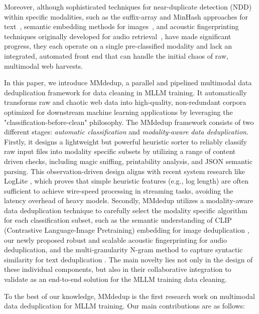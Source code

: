 \documentclass[sigconf, nonacm]{acmart}
\begin{document}
Moreover, although sophisticated techniques for near-duplicate detection (NDD) within specific modalities, such as the suffix-array and MinHash approaches for text~\cite{lee2022deduplicating}, semantic embedding methods for images~\cite{abbas2023semdedup}, and acoustic fingerprinting techniques originally developed for audio retrieval~\cite{wang2003industrial}, have made significant progress, they each operate on a single pre-classified modality and lack an integrated, automated front end that can handle the initial chaos of raw, multimodal web harvests.

In this paper, we introduce MMdedup, a parallel and pipelined multimodal data deduplication framework for data cleaning in MLLM training. It automatically transforms raw and chaotic web data into high-quality, non-redundant corpora optimized for downstream machine learning applications by leveraging the "classification-before-clean" philosophy. The MMdedup framework consists of two different stages: \textit{automatic classification} and \textit{modality-aware data deduplication}. Firstly, it designs a lightweight but powerful heuristic sorter to reliably classify raw input files into modality specific subsets by utilizing a range of content driven checks, including magic sniffing, printability analysis, and JSON semantic parsing. This observation-driven design aligns with recent system research like LogLite \cite{tang2025loglite}, which proves that simple heuristic features (e.g., log length) are often sufficient to achieve wire-speed processing in streaming tasks, avoiding the latency overhead of heavy models. Secondly, MMdedup utilizes a modality-aware data deduplication technique to carefully select the modality specific algorithm for each classification subset, such as the semantic understanding of CLIP (Contrastive Language-Image Pretraining) embedding for image deduplication \cite{radford2021learning}, our newly proposed robust and scalable acoustic fingerprinting for audio deduplication, and the multi-granularity N-gram method to capture syntactic similarity for text deduplication \cite{broder1997resemblance}. The main novelty lies not only in the design of these individual components, but also in their collaborative integration to validate as an end-to-end solution for the MLLM training data cleaning.


To the best of our knowledge, MMdedup is the first research work on multimodal data deduplication for MLLM training. Our main contributions are as follows:
\end{document}
